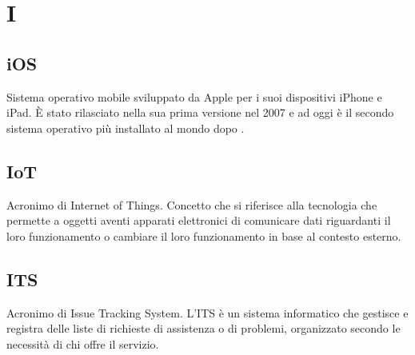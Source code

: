 \section*{I}
\markright{}

\subsection*{iOS}
Sistema operativo mobile sviluppato da Apple per i suoi dispositivi iPhone e iPad. È stato rilasciato nella sua prima versione nel 2007 e ad oggi è il secondo sistema operativo più installato al mondo dopo .

\subsection*{IoT}
Acronimo di Internet of Things. Concetto che si riferisce alla tecnologia che permette a oggetti aventi apparati elettronici di comunicare dati riguardanti il loro funzionamento o cambiare il loro funzionamento in base al contesto esterno. 

\subsection*{ITS}
Acronimo di Issue Tracking System. L'ITS è un sistema informatico che gestisce e registra delle liste di richieste di assistenza o di problemi, organizzato secondo le necessità di chi offre il servizio.